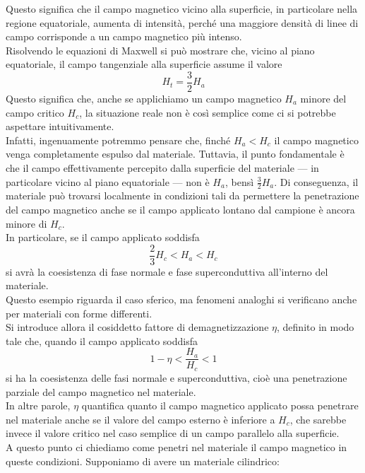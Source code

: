 Questo significa che il campo magnetico vicino alla superficie, in particolare nella regione equatoriale, aumenta di intensità, perché una maggiore densità di linee di campo corrisponde a un campo magnetico più intenso.\\
Risolvendo le equazioni di Maxwell si può mostrare che, vicino al piano equatoriale, il campo tangenziale alla superficie assume il valore
\begin{equation*}
   H_t=\frac{3}{2}H_a
\end{equation*}
Questo significa che, anche se applichiamo un campo magnetico $H_a$ minore del campo critico $H_c$, la situazione reale non è così semplice come ci si potrebbe aspettare intuitivamente.\\
Infatti, ingenuamente potremmo pensare che, finché $H_a < H_c$ il campo magnetico venga completamente espulso dal materiale. Tuttavia, il punto fondamentale è che il campo effettivamente percepito dalla superficie del materiale — in particolare vicino al piano equatoriale — non è $H_a$, bensì $\frac{3}{2}H_a$. Di conseguenza, il materiale può trovarsi localmente in condizioni tali da permettere la penetrazione del campo magnetico anche se il campo applicato lontano dal campione è ancora minore di $H_c$.\\
In particolare, se il campo applicato soddisfa
\begin{equation*}
   \frac{2}{3}H_c < H_a < H_c
\end{equation*}
si avrà la coesistenza di fase normale e fase superconduttiva all'interno del materiale.\\
Questo esempio riguarda il caso sferico, ma fenomeni analoghi si verificano anche per materiali con forme differenti.\\
Si introduce allora il cosiddetto fattore di demagnetizzazione $\eta$, definito in modo tale che, quando il campo applicato soddisfa
\begin{equation*}
   1-\eta < \frac{H_a}{H_c} < 1
\end{equation*}
si ha la coesistenza delle fasi normale e superconduttiva, cioè una penetrazione parziale del campo magnetico nel materiale.\\
In altre parole, $\eta$ quantifica quanto il campo magnetico applicato possa penetrare nel materiale anche se il valore del campo esterno è inferiore a $H_c$, che sarebbe invece il valore critico nel caso semplice di un campo parallelo alla superficie.\\
A questo punto ci chiediamo come penetri nel materiale il campo magnetico in queste condizioni. Supponiamo di avere un materiale cilindrico:
